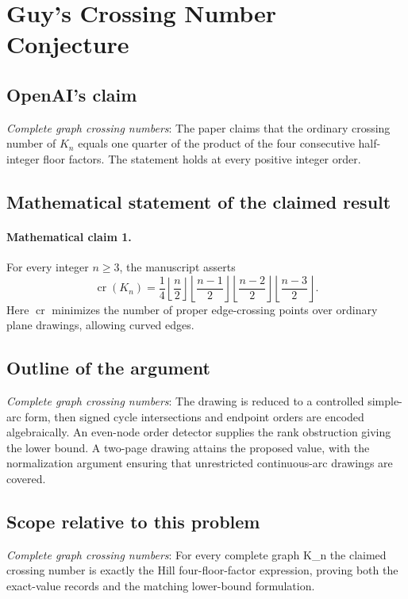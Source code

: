 \documentclass[11pt]{article}
\begin{document}
\section*{Guy's Crossing Number Conjecture}

\subsection{OpenAI's claim}
\textit{Complete graph crossing numbers}: The paper claims that the ordinary crossing number of $K_n$ equals one quarter of the product of the four consecutive half-integer floor factors. The statement holds at every positive integer order.

\subsection{Mathematical statement of the claimed result}
\paragraph{Mathematical claim 1.} For every integer $n\ge3$, the manuscript asserts \[\operatorname{cr}(K_n)=\frac14\left\lfloor\frac n2\right\rfloor\left\lfloor\frac{n-1}2\right\rfloor\left\lfloor\frac{n-2}2\right\rfloor\left\lfloor\frac{n-3}2\right\rfloor.\] Here $\operatorname{cr}$ minimizes the number of proper edge-crossing points over ordinary plane drawings, allowing curved edges.

\subsection{Outline of the argument}
\textit{Complete graph crossing numbers}: The drawing is reduced to a controlled simple-arc form, then signed cycle intersections and endpoint orders are encoded algebraically. An even-node order detector supplies the rank obstruction giving the lower bound. A two-page drawing attains the proposed value, with the normalization argument ensuring that unrestricted continuous-arc drawings are covered.

\subsection{Scope relative to this problem}
\textit{Complete graph crossing numbers}: For every complete graph K\_n the claimed crossing number is exactly the Hill four-floor-factor expression, proving both the exact-value records and the matching lower-bound formulation.
\end{document}
